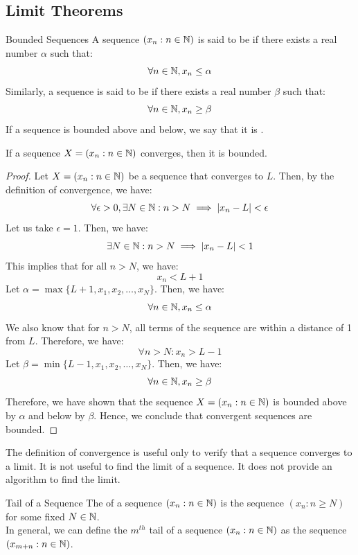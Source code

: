 \documentclass[openany]{book}
\begin{document}
\subsection{Limit Theorems}
\begin{mydefinition}{Bounded Sequences}
    A sequence $(x_n : n \in \mathbb{N})$ is said to be  if there exists a real number $\alpha$ such that:
    $$\forall n \in \mathbb{N}, x_n \leq \alpha$$
    Similarly, a sequence is said to be  if there exists a real number $\beta$ such that:
    $$\forall n \in \mathbb{N}, x_n \geq \beta$$
    If a sequence is bounded above and below, we say that it is .
\end{mydefinition}
\begin{mytheorem}
    If a sequence $X = (x_n : n \in \mathbb{N})$ converges, then it is bounded. 
\end{mytheorem}
\begin{proof}
    Let $X = (x_n : n \in \mathbb{N})$ be a sequence that converges to $L$. Then, by the definition of convergence, we have:
    $$\forall \epsilon > 0, \exists N \in \mathbb{N}: n > N \implies |x_n - L| < \epsilon$$
    Let us take $\epsilon = 1$. Then, we have:
    $$\exists N \in \mathbb{N}: n > N \implies |x_n - L| < 1$$
    This implies that for all $n > N$, we have:
    $$x_n < L + 1$$
    Let $\alpha = \max\{L + 1, x_1, x_2, \ldots, x_N\}$. 
    Then, we have:
    $$\forall n \in \mathbb{N}, x_n \leq \alpha$$
    We also know that for $n > N$, all terms of the sequence are within a distance of 1 from $L$. Therefore, we have:
    $$\forall n> N: x_n > L - 1$$
    Let $\beta = \min\{L - 1, x_1, x_2, \ldots, x_N\}$. 
    Then, we have:
    $$\forall n \in \mathbb{N}, x_n \geq\beta$$
    Therefore, we have shown that the sequence $X = (x_n : n \in \mathbb{N})$ is bounded above by $\alpha$ and below by $\beta$. Hence, we conclude that convergent sequences are bounded.
\end{proof}
\begin{mynote}
    The definition of convergence is useful only to verify that a sequence converges to a limit. It is not useful to find the limit of a sequence. It does not provide an algorithm to find the limit. 
\end{mynote}
\begin{mydefinition}{Tail of a Sequence}
    The  of a sequence $(x_n : n \in \mathbb{N})$ is the sequence $(x_n : n \geq N)$ for some fixed $N \in \mathbb{N}$. \\
    In general, we can define the $m^{th}$ tail of a sequence $(x_n : n \in \mathbb{N})$ as the sequence $(x_{m+n} : n \in \mathbb{N})$.
\end{mydefinition}
\end{document}
